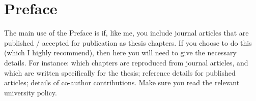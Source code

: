 %
\chapter*{Preface}
%
The main use of the Preface is if, like me, you include journal articles that are published / accepted for publication as thesis chapters. If you choose to do this (which I highly recommend), then here you will need to give the necessary details. For instance: which chapters are reproduced from journal articles, and which are written specifically for the thesis; reference details for published articles; details of co-author contributions. Make sure you read the relevant university policy.
%
\cleardoublepage
%